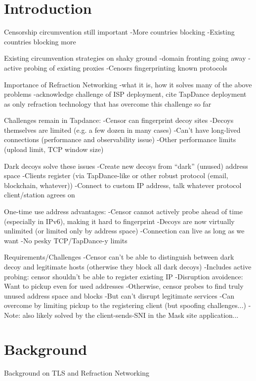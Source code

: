 \documentclass[letterpaper,twocolumn,10pt]{article}
\begin{document}
\section{Introduction}

Censorship circumvention still important
-More countries blocking
-Existing countries blocking more

Existing circumvention strategies on shaky ground
-domain fronting going away
-active probing of existing proxies
-Cenosrs fingerprinting known protocols

Importance of Refraction Networking
-what it is, how it solves many of the above problems
-acknowledge challenge of ISP deployment, cite TapDance deployment as only refraction technology that has overcome this challenge so far

Challenges remain in Tapdance:
-Censor can fingerprint decoy sites
-Decoys themselves are limited (e.g. a few dozen in many cases)
-Can't have long-lived connections (performance and observability issue)
-Other performance limits (upload limit, TCP window size)

Dark decoys solve these issues
-Create new decoys from ``dark'' (unused) address space
-Clients register (via TapDance-like or other robust protocol (email, blockchain, whatever))
-Connect to custom IP address, talk whatever protocol client/station agrees on

One-time use address advantages:
-Censor cannot actively probe ahead of time (especially in IPv6), making it hard to fingerprint
-Decoys are now virtually unlimited (or limited only by address space)
-Connection can live as long as we want
-No pesky TCP/TapDance-y limits

Requirements/Challenges
-Censor can't be able to distinguish between dark decoy and legitimate hosts
    (otherwise they block all dark decoys)
    -Includes active probing: censor shouldn't be able to register existing IP
-Disruption avoidence: Want to pickup even for used addresses
    -Otherwise, censor probes to find truly unused address space and blocks
    -But can't disrupt legitimate services
    -Can overcome by limiting pickup to the registering client (but spoofing challenges...)
    -Note: also likely solved by the client-sends-SNI in the Mask site application...



\section{Background}
Background on TLS and Refraction Networking
\end{document}
